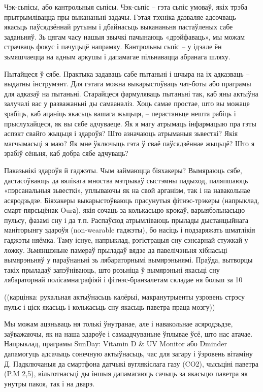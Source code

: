 Чэк-сьпісы, або кантрольныя сьпісы. Чэк-сьпіс – гэта сьпіс умоваў, якіх трэба прытрымлівацца пры выкананьні задачы. Гэтая тэхніка дазваляе адсочваць якасьць паўсядзённай рутыны і дбайнасьць выкананьня пастаўленых сабе заданьняў. Зь цягам часу нашыя звычкі пачынаюць «дрэйфаваць», мы можам страчваць фокус і пачуцьцё напрамку. Кантрольны сьпіс – у ідэале ён зьмяшчаецца на адным аркушы і дапамагае пільнавацца абранага шляху.

Пытайцеся ў сябе. Практыка задаваць сабе пытаньні і шчыра на іх адказваць – выдатны інструмэнт. Для гэтага можна выкарыстоўваць чат-боты або праграмы для адказаў на пытаньні. Старайцеся фармуляваць пытаньні так, каб яны актыўна залучалі вас у разважаньні ды самааналіз. Хоць самае простае, што вы можаце зрабіць, каб ацаніць якасьць вашага жыцьця, – перастаньце нешта рабіць і прыслухайцеся, як вы сябе адчуваеце. Як я магу атрымаць інфармацыю пра гэты аспэкт свайго жыцьця і здароўя? Што азначаюць атрыманыя зьвесткі? Якія магчымасьці я маю? Як мне ўключыць гэта ў сваё паўсядзённае жыцьцё? Што я зрабіў сёньня, каб добра сябе адчуваць?

Паказьнікі здароўя й гаджэты. Чым займаюцца біяхакеры? Вымяраюць сябе, дастасоўваюць да вялікага мноства мэтрыкаў сыстэмны падыход, паляпшаюць «пэрсанальныя зьвесткі», уплываючы як на свой арганізм, так і на навакольнае асяродзьдзе. Біяхакеры выкарыстоўваюць прасунутыя фітнэс-трэкеры (напрыклад, смарт-пярсьцёнак Ourа), якія сочаць за колькасьцю крокаў, варыябэльнасьцю пульсу, фазамі сну і да т.п. Распаўсюд атрымліваюць прылады дыстанцыйнага маніторынгу здароўя (non-wearable гаджэты), бо насіць і подзаряжать шматлікія гаджэты няёмка. Таму існуе, напрыклад, рэгістрацыя сну сэнсарнай стужкай у ложку. Зьмяншэньне памераў прыладаў вядзе да павелічэньня хібнасьці вымярэньняў у параўнаньні зь лябараторнымі вымярэньнямі. Праўда, вытворцы такіх прыладаў запэўніваюць, што розьніца ў вымярэньні якасьці сну лябараторнай полісамнаграфіяй і фітнэс-бранзалетам складае ня больш за 10%

((карцінка: рухальная актыўнасьць калёрыі, макранутрыенты узровень стрэсу пульс і ціск якасьць і колькасьць сну якасьць паветра праца мозгу))

Мы можам ацэньваць ня толькі ўнутранае, але і навакольнае асяродзьдзе, заўважаючы, як на наша здароўе і самаадчуваньне ўплывае ўсё, што нас атачае. Напрыклад, праграмы SunDay: Vitamin D & UV Monitor або Dminder дапамогуць адсачыць сонечную актыўнасьць, час для загару і ўзровень вітаміну Д. Падключаныя да смартфона датчыкі вуглякіслага газу (CO2), чысьціні паветра (P.M 2,5), вільготнасьці ды іншыя дапамагаюць сачыць за якасьцю паветра як унутры пакоя, так і на дварэ.

